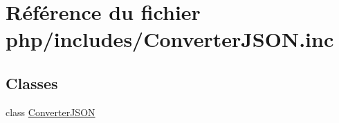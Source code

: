\hypertarget{_converter_j_s_o_n_8inc}{}\section{Référence du fichier php/includes/\+Converter\+J\+S\+ON.inc}
\label{_converter_j_s_o_n_8inc}
\subsection*{Classes}
\begin{DoxyCompactItemize}
\item 
class \hyperlink{class_converter_j_s_o_n}{Converter\+J\+S\+ON}
\end{DoxyCompactItemize}
